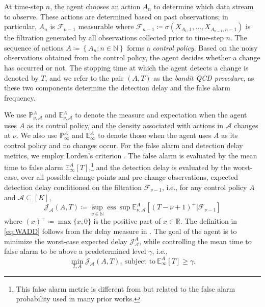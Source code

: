 \documentclass[letterpaper, 10 pt, conference]{ieeeconf}  %
\newcommand{\lp}{\left(}
\newcommand{\rp}{\right)}
\newcommand{\lb}{\left[}
\newcommand{\rb}{\right]}
\newcommand{\lbp}{\left\{}
\newcommand{\rbp}{\right\}}
\newcommand{\mcal}{\mathcal}
\newcommand{\mrm}{\mathrm}
\newcommand{\mbb}{\mathbb}
\newcommand{\E}{\mathbb{E}}
\begin{document}
At time-step $n$, the agent chooses an action $A_{n}$ to determine which data stream to observe. These actions are determined based on past observations; in particular, $A_{n}$ is $\mcal{F}_{n-1}$ measurable where $\mcal{F}_{n-1} \coloneqq \sigma \lp X_{A_{1},1}, \dots, X_{A_{n-1},n-1} \rp$ is the filtration generated by all observations collected prior to time-step $n$. The sequence of actions $A \coloneqq \lbp A_{n}: n \in \mbb{N} \rbp$ forms a \emph{control policy}. 
Based on the noisy observations obtained from the control policy, the agent decides whether a change has occurred or not. The stopping time at which the agent detects a change is denoted by $T$, and we refer to the pair $\lp A, T \rp$ as the \emph{bandit QCD procedure}, as these two components determine the detection delay and the false alarm frequency.


We use $\mbb{P}_{\nu, \mcal{A}}^{A}$ and $\E_{\nu, \mcal{A}}^{A}$ to denote the  measure and expectation when the agent uses $A$ as its control policy, and the density associated with actions in $\mcal{A}$ changes at $\nu$. We also use $\mbb{P}_{\infty}^{A}$ and $\E_{\infty}^{A}$ to denote those when the agent uses $A$ as its control policy and no changes occur. For the false alarm and detection delay metrics, we employ Lorden's criterion \cite{lorden1971procedures}. The false alarm is evaluated by the mean time to false alarm $\E_{\infty}^{A}\lb T \rb$,\footnote{This false alarm metric is different from but related to the false alarm probability used in many prior works.} and the detection delay is evaluated by the worst-case, over all possible change-points and pre-change observations, expected detection delay conditioned on the filtration $\mcal{F}_{\nu-1}$, i.e., for any control policy $A$ and $\mcal{A}\subseteq \lb K \rb$,
%
\begin{equation}\label{eq:WADD}
    \!\!\mcal{J}_{\mcal{A}}\lp A, T \rp\!\coloneqq\! \sup_{\nu \in \mbb{N}}\mrm{\:ess\:}\sup \E_{\nu,\mcal{A}}^{A} \!\lb \lp T - \nu + 1\rp^{+} \!\Big| \mcal{F}_{\nu-1} \rb
\end{equation}
%
where $\lp x \rp^{+} \coloneqq \max\{x, 0\}$ is the positive part of $x \in \mbb{R}$. The definition in \eqref{eq:WADD} follows from the delay measure in \cite{veeravalli2024quickest}. The goal of the agent is to minimize the worst-case expected delay $\mcal{J}_{\mcal{A}}^{A}$, while controlling the mean time to false alarm to be above a predetermined level $\gamma$, i.e.,
%
\begin{equation}\label{eq:QCD}
    \min_{T,A} \mcal{J}_{\mcal{A}}\lp A, T \rp, \:\textrm{subject to}\:\E_{\infty}^{A}\lb T \rb \geq \gamma.
\end{equation}
%
\end{document}
